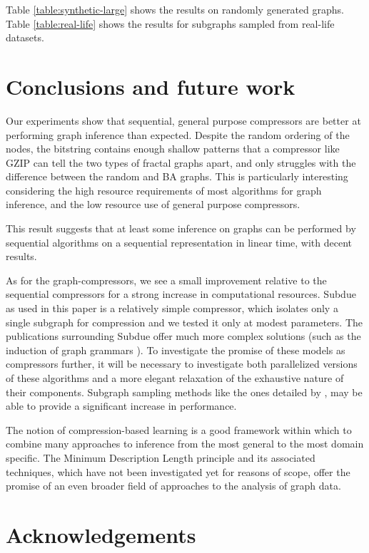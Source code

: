 \documentclass{article}
\begin{document}
Table \ref{table:synthetic-large} shows the results on randomly generated graphs. Table \ref{table:real-life} shows the results for subgraphs sampled from real-life datasets.

\section*{Conclusions and future work}

Our experiments show that sequential, general purpose compressors are better at performing graph inference than expected. Despite the random ordering of the nodes, the bitstring contains enough shallow patterns that a compressor like GZIP can tell the two types of fractal graphs apart, and only struggles with the difference between the random and BA graphs. This is particularly interesting considering the high resource requirements of most algorithms for graph inference, and the low resource use of general purpose compressors. 

This result suggests that at least some inference on graphs can be performed by sequential algorithms on a sequential representation in linear time, with decent results.

As for the graph-compressors, we see a small improvement relative to the sequential compressors for a strong increase in computational resources. Subdue as used in this paper is a relatively simple compressor, which isolates only a single subgraph for compression and we tested it only at modest parameters. The publications surrounding Subdue offer much more complex solutions (such as the induction of graph grammars \cite{jonyer2004mdl}). To investigate the promise of these models as compressors further, it will be necessary to investigate both parallelized versions of these algorithms and a more elegant relaxation of the exhaustive nature of their components. Subgraph sampling methods like the ones detailed by , may be able to provide a significant increase in performance.

The notion of compression-based learning is a good framework within which to combine many approaches to inference from the most general to the most domain specific. The Minimum Description Length principle and its associated techniques, which have not been investigated yet for reasons of scope, offer the promise of an even broader field of approaches to the analysis of graph data.

\section*{Acknowledgements}
\end{document}
